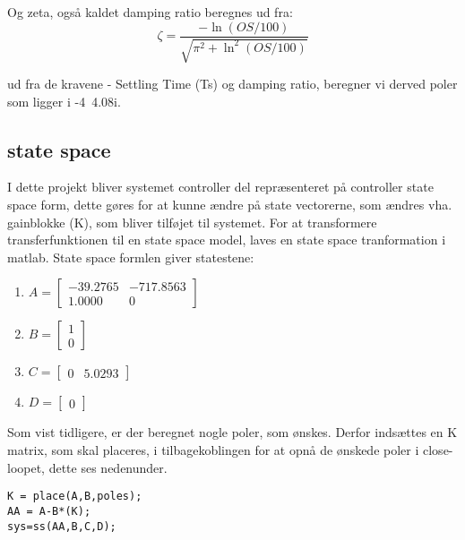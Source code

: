 Og zeta, også kaldet damping ratio beregnes ud fra: 
\begin{equation}
  \zeta = \frac{-\ln(OS/100)}{\sqrt{\pi^2+\ln^2(OS/100)}}
\end{equation} 

ud fra de kravene - Settling Time (Ts) og damping ratio, beregner vi derved poler som ligger i -4\textpm\ 4.08i. 

\subsection{state space}

I dette projekt bliver systemet controller del repræsenteret på controller state space form, dette gøres for at kunne ændre på state vectorerne, som ændres vha. gainblokke (K), som bliver tilføjet til systemet. For at transformere transferfunktionen til en state space model, laves en state space tranformation i matlab. State space formlen giver statestene: 

\begin{enumerate}
 
\item
 $
A = 
\begin{bmatrix}

	-39.2765 & -717.8563 \\
    1.0000     &    0
\end{bmatrix}
     $
\item
 $
B = 
\begin{bmatrix}

	1\\
    0
\end{bmatrix}
     $    
  
\item 
 $
C = 
\begin{bmatrix}

	0  &  5.0293
\end{bmatrix}
     $    
 \item
 $
D = 
\begin{bmatrix}

	0  
\end{bmatrix}
     $  
\end{enumerate}      
Som vist tidligere, er der beregnet nogle poler, som ønskes. Derfor indsættes en K matrix, som skal placeres, i tilbagekoblingen for at opnå de ønskede poler i close-loopet, dette ses nedenunder. 

\begin{lstlisting}[frame=single]
K = place(A,B,poles);
AA = A-B*(K);
sys=ss(AA,B,C,D);
\end{lstlisting}

